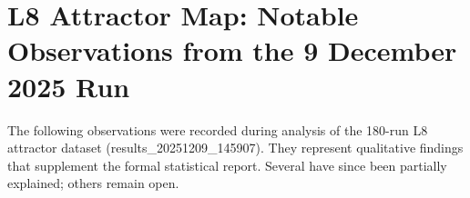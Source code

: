 
\section{L8 Attractor Map: Notable Observations from the 9 December 2025 Run}

The following observations were recorded during analysis of the 180-run
L8 attractor dataset (results\_20251209\_145907). They represent
qualitative findings that supplement the formal statistical report.
Several have since been partially explained; others remain open.

